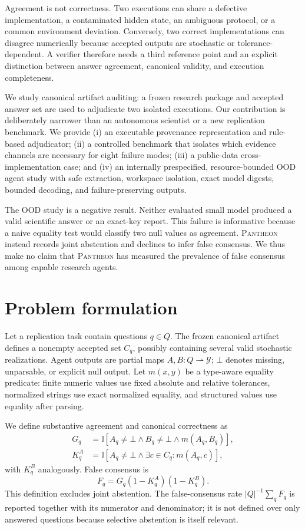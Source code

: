 \documentclass[10pt]{article}
\newcommand{\pantheon}{\textsc{Pantheon}}
\newcommand{\ind}{\mathbb{I}}
\begin{document}
Agreement is not correctness. Two executions can share a defective implementation, a contaminated hidden state, an ambiguous protocol, or a common environment deviation. Conversely, two correct implementations can disagree numerically because accepted outputs are stochastic or tolerance-dependent. A verifier therefore needs a third reference point and an explicit distinction between answer agreement, canonical validity, and execution completeness.

We study canonical artifact auditing: a frozen research package and accepted answer set are used to adjudicate two isolated executions. Our contribution is deliberately narrower than an autonomous scientist or a new replication benchmark. We provide (i) an executable provenance representation and rule-based adjudicator; (ii) a controlled benchmark that isolates which evidence channels are necessary for eight failure modes; (iii) a public-data cross-implementation case; and (iv) an internally prespecified, resource-bounded OOD agent study with safe extraction, workspace isolation, exact model digests, bounded decoding, and failure-preserving outputs.

The OOD study is a negative result. Neither evaluated small model produced a valid scientific answer or an exact-key report. This failure is informative because a naive equality test would classify two null values as agreement. \pantheon{} instead records joint abstention and declines to infer false consensus. We thus make no claim that \pantheon{} has measured the prevalence of false consensus among capable research agents.

\section{Problem formulation}
Let a replication task contain questions $q\in Q$. The frozen canonical artifact defines a nonempty accepted set $C_q$, possibly containing several valid stochastic realizations. Agent outputs are partial maps $A,B:Q\rightharpoonup\mathcal{Y}$; $\bot$ denotes missing, unparsable, or explicit null output. Let $m(x,y)$ be a type-aware equality predicate: finite numeric values use fixed absolute and relative tolerances, normalized strings use exact normalized equality, and structured values use equality after parsing.

We define substantive agreement and canonical correctness as
\begin{align}
G_q &= \ind[A_q\neq\bot\land B_q\neq\bot\land m(A_q,B_q)],\\
K_q^A &= \ind[A_q\neq\bot\land \exists c\in C_q:m(A_q,c)],
\end{align}
with $K_q^B$ analogously. False consensus is
\begin{equation}
F_q=G_q(1-K_q^A)(1-K_q^B).
\end{equation}
This definition excludes joint abstention. The false-consensus rate $|Q|^{-1}\sum_qF_q$ is reported together with its numerator and denominator; it is not defined over only answered questions because selective abstention is itself relevant.
\end{document}
